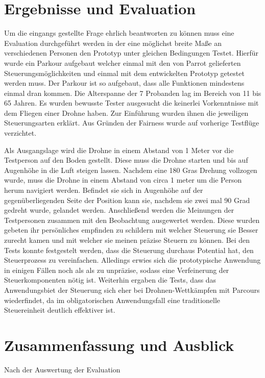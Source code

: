\documentclass{article}
\begin{document}
\section{Ergebnisse und Evaluation}
Um die eingangs gestellte Frage ehrlich beantworten zu können muss eine Evaluation durchgeführt werden in der eine möglichst breite Maße an verschiedenen Personen den Prototyp unter gleichen Bedingungen Testet. Hierfür wurde ein Parkour aufgebaut welcher einmal mit den von Parrot gelieferten Steuerungsmöglichkeiten und einmal mit dem entwickelten Prototyp getestet werden muss. Der Parkour ist so aufgebaut, dass alle Funktionen mindestens einmal dran kommen. 
Die Alterspanne der 7 Probanden lag im Bereich von 11 bis 65 Jahren. Es wurden bewusste Tester ausgesucht die keinerlei Vorkenntnisse mit dem Fliegen einer Drohne haben. 
Zur Einführung wurden ihnen die jeweiligen Steuerungsarten erklärt. Aus Gründen der Fairness wurde auf vorherige Testflüge verzichtet.

Als Ausgangslage wird die Drohne in einem Abstand von 1 Meter vor die Testperson auf den Boden gestellt. Diese muss die Drohne starten und bis auf Augenhöhe in die Luft steigen lassen. Nachdem eine 180 Gras Drehung vollzogen wurde, muss die Drohne in einem Abstand von circa 1 meter um die Person herum navigiert werden. Befindet sie sich in Augenhöhe auf der gegenüberliegenden Seite der Position kann sie, nachdem sie zwei mal 90 Grad gedreht wurde, gelandet werden.
Anschließend werden die Meinungen der Testpersonen zusammen mit den Beobachtung ausgewertet werden. Diese wurden gebeten ihr persönliches empfinden zu schildern mit welcher Steuerung sie Besser zurecht kamen und mit welcher sie meinen präzise Steuern zu können.
Bei den Tests konnte festgestelt werden, dass die Steuerung durchaus Potential hat, den Steuerprozess zu vereinfachen. Alledings erwies sich die prototypische Anwendung in einigen Fällen noch als
als zu unpräzise, sodass eine Verfeinerung der Steuerkomponenten nötig ist. Weiterhin ergaben die Tests, dass das Anwendungsbiet der Steuerung sich eher bei Drohnen-Wettkämpfen mit
Parcours wiederfindet, da im obligatorischen Anwendungsfall eine traditionelle Steuereinheit deutlich effektiver ist.
\section{Zusammenfassung und Ausblick}
Nach der Auswertung der Evaluation 
{}

\end{document}
